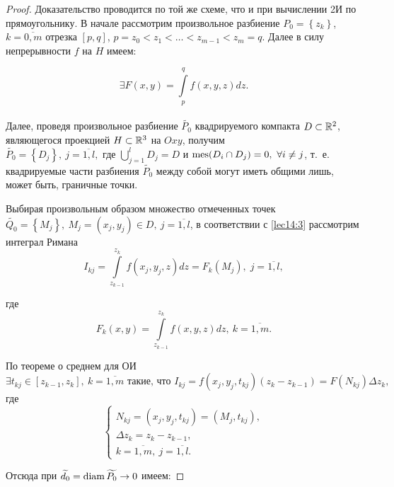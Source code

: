 \documentclass[../../main.tex]{subfiles}
\begin{document}
		
	\begin{proof}
		Доказательство проводится по той же схеме, что и при вычислении 2И по 
		прямоугольнику. В начале рассмотрим произвольное разбиение $P_0 = \left\{ 
		z_k \right\}$, $k = 
		\overline{0, m}$ отрезка $\left[p, q\right]$, $p = z_0 < z_1 < \ldots < z_{m 
		- 1} < z_m = q.$ Далее в силу непрерывности $f$ на $H$ имеем:
		
		\begin{equation}
		\exists F\left(x, y\right) = \int\limits_{p}^{q} f\left(x, y, z\right) dz.
		\label{lec14:3}
		\end{equation}\\
		Далее, проведя произвольное разбиение $\widetilde{P_0}$ квадрируемого 
		компакта $D \subset 
		\mathbb{R}^2$, являющегося проекцией $H \subset \mathbb{R}^3$ на $Oxy$, получим
		$\widetilde{P_0} = \left\{D_j \right\},\ j = \overline{1, l}, \text{ где } 
		\bigcup\limits_{j = 1}^l D_j = D$ и $\operatorname{mes}(D_i \cap D_j) = 0,\ \forall i \neq 
		j$, т.~е. квадрируемые части разбиения $\widetilde{P_0}$ между собой могут 
		иметь общими 
		лишь, может быть, граничные точки.
		
		Выбирая произвольным образом множество отмеченных точек $\widetilde{Q_0} = 
		\left\{ M_j \right\},\ M_j = \left(x_j, y_j\right) \in D,\ j = \overline{1, 
		l}$, в соответствии с \eqref{lec14:3} рассмотрим интеграл Римана
		\begin{equation} 
		I_{kj} = \int\limits_{z_{k-1}}^{z_k} f(x_j, y_j, z)dz = F_k (M_j),\; j = 
		\overline{1, l},  \label{lec14:4}
		\end{equation}
		
		где \[F_k(x, y) = \int\limits_{z_{k - 1}}^{z_k} f\left(x, y, z\right)dz,\ k 
		= 
		\overline{1, m}.\]
		 
		По теореме о среднем для ОИ
		\begin{equation}
			\exists t_{kj} \in \left[z_{k - 1}, z_k 
		\right],\ k = \overline{1, m} \text{ такие, что }
		 	I_{kj} = f(x_j, y_j, t_{kj})\left(z_k - z_{k - 1}\right) = 
		 	F(N_{kj}) \Delta z_k, \label{lec14:5}
		 \end{equation}
		где \[\begin{cases}
		N_{kj} = (x_j, y_j, t_{kj}) = (M_j, t_{kj}),\\
		\Delta z_k = z_k - z_{k - 1}, \\ k = \overline{1, m},\ j = \overline{1, l}.
		\end{cases}\]
		
		Отсюда при $\widetilde{d_0} = \operatorname{diam} \widetilde{P_0} \to 0$ имеем: 
		

\end{proof}
\end{document}
